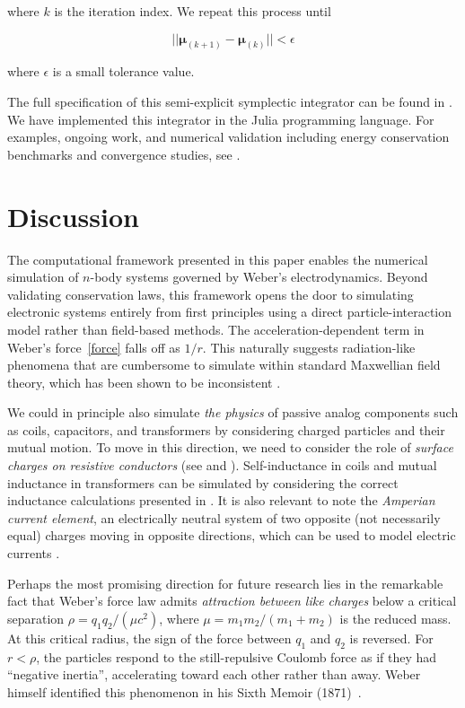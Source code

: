 \documentclass[12pt,a4paper]{article}
\theoremstyle{definition}
\theoremstyle{remark}
\begin{document}
where $k$ is the iteration index. We repeat this process until

\begin{equation}
    ||\boldsymbol{\mu}_{(k+1)} - \boldsymbol{\mu}_{(k)}|| < \epsilon
\end{equation}

where $\epsilon$ is a small tolerance value.

The full specification of this semi-explicit symplectic integrator can be found in \citep{Jayawardana2023}. We have implemented this integrator in the Julia programming language. For examples, ongoing work, and numerical validation including energy conservation benchmarks and convergence studies, see \citep{WeberElectrodynamics.jl}.

\section{Discussion}

The computational framework presented in this paper enables the numerical simulation of $n$-body systems governed by Weber's electrodynamics. Beyond validating conservation laws, this framework opens the door to simulating electronic systems entirely from first principles using a direct particle-interaction model rather than field-based methods. The acceleration-dependent term in Weber's force~\eqref{force} falls off as $1/r$. This naturally suggests radiation-like phenomena that are cumbersome to simulate within standard Maxwellian field theory, which has been shown to be inconsistent \citep{vlaenderen2016}.

We could in principle also simulate \textit{the physics} of passive analog components such as coils, capacitors, and transformers by considering charged particles and their mutual motion. To move in this direction, we need to consider the role of \textit{surface charges on resistive conductors} (see \citep{jackson1996} and \citep{assis-electric-force}). Self-inductance in coils and mutual inductance in transformers can be simulated by considering the correct inductance calculations presented in \citep{assis-inductance}. It is also relevant to note the \textit{Amperian current element}, an electrically neutral system of two opposite (not necessarily equal) charges moving in opposite directions, which can be used to model electric currents \citep{assis-ampere}.

Perhaps the most promising direction for future research lies in the remarkable fact that Weber's force law admits \textit{attraction between like charges} below a critical separation $\rho = q_1 q_2/(\mu c^2)$, where $\mu = m_1 m_2 / (m_1 + m_2)$ is the reduced mass. At this critical radius, the sign of the force between $q_1$ and $q_2$ is reversed. For $r < \rho$, the particles respond to the still-repulsive Coulomb force as if they had ``negative inertia'', accelerating toward each other rather than away. Weber himself identified this phenomenon in his Sixth Memoir (1871)~\citep{assis-weber-vol4}.
\end{document}
